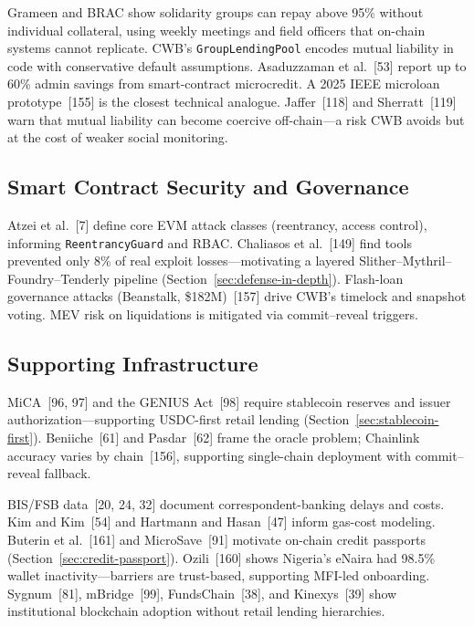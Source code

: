 \documentclass[12pt,a4paper]{report}
\begin{document}
Grameen and BRAC show solidarity groups can repay above 95\% without individual collateral, using weekly meetings and field officers that on-chain systems cannot replicate. CWB's \texttt{GroupLendingPool} encodes mutual liability in code with conservative default assumptions. Asaduzzaman et al.~[53] report up to 60\% admin savings from smart-contract microcredit. A 2025 IEEE microloan prototype~[155] is the closest technical analogue. Jaffer~[118] and Sherratt~[119] warn that mutual liability can become coercive off-chain---a risk CWB avoids but at the cost of weaker social monitoring.

\subsection{Smart Contract Security and Governance}

Atzei et al.~[7] define core EVM attack classes (reentrancy, access control), informing \texttt{ReentrancyGuard} and RBAC. Chaliasos et al.~[149] find tools prevented only 8\% of real exploit losses---motivating a layered Slither--Mythril--Foundry--Tenderly pipeline (Section~\ref{sec:defense-in-depth}). Flash-loan governance attacks (Beanstalk, \$182M)~[157] drive CWB's timelock and snapshot voting. MEV risk on liquidations is mitigated via commit--reveal triggers.

\subsection{Supporting Infrastructure}
\label{sec:lit-stablecoin-reg}
\label{sec:lit-sbt}
\label{sec:lit-institutional}

MiCA~[96, 97] and the GENIUS Act~[98] require stablecoin reserves and issuer authorization---supporting USDC-first retail lending (Section~\ref{sec:stablecoin-first}). Beniiche~[61] and Pasdar~[62] frame the oracle problem; Chainlink accuracy varies by chain~[156], supporting single-chain deployment with commit--reveal fallback.

BIS/FSB data~[20, 24, 32] document correspondent-banking delays and costs. Kim and Kim~[54] and Hartmann and Hasan~[47] inform gas-cost modeling. Buterin et al.~[161] and MicroSave~[91] motivate on-chain credit passports (Section~\ref{sec:credit-passport}). Ozili~[160] shows Nigeria's eNaira had 98.5\% wallet inactivity---barriers are trust-based, supporting MFI-led onboarding. Sygnum~[81], mBridge~[99], FundsChain~[38], and Kinexys~[39] show institutional blockchain adoption without retail lending hierarchies.
\end{document}
